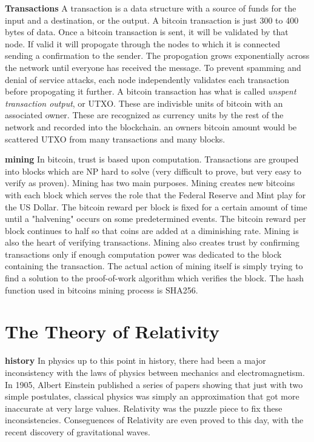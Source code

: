 \documentclass[conference]{IEEEtran}
\begin{document}
\textbf{Transactions} A transaction is a data structure with a source of funds for the input and a destination, or the output. A bitcoin transaction is just 300 to 400 bytes of data. Once a bitcoin transaction is sent, it will be validated by that node. If valid it will propogate through the nodes to which it is connected sending a confirmation to the sender. The propogation grows exponentially across the network until everyone has received the message. To prevent spamming and denial of service attacks, each node independently validates each transaction before propogating it further. A bitcoin transaction has what is called \textit{unspent transaction output}, or UTXO. These are indivisble units of bitcoin with an associated owner. These are recognized as currency units by the rest of the network and recorded into the blockchain. an owners bitcoin amount would be scattered UTXO from many transactions and many blocks. 

\textbf{mining} In bitcoin, trust is based upon computation. Transactions are grouped into blocks which are NP hard to solve (very difficult to prove, but very easy to verify as proven). Mining has two main purposes. Mining creates new bitcoins with each block which serves the role that the Federal Reserve and Mint play for the US Dollar. The bitcoin reward per block is fixed for a certain amount of time until a "halvening" occurs on some predetermined events. The bitcoin reward per block continues to half so that coins are added at a diminishing rate. Mining is also the heart of verifying transactions. Mining also creates trust by confirming transactions only if enough computation power was dedicated to the block containing the transaction. The actual action of mining itself is simply trying to find a solution to the proof-of-work algorithm which verifies the block. The hash function used in bitcoins mining process is SHA256. 

\section{The Theory of Relativity}
\textbf{history} In physics up to this point in history, there had been a major inconsistency with the laws of physics between mechanics and electromagnetism. In 1905, Albert Einstein published a series of papers showing that just with two simple postulates, classical physics was simply an approximation that got more inaccurate at very large values. Relativity was the puzzle piece to fix these inconsistencies. Conseguences of Relativity are even proved to this day, with the recent discovery of gravitational waves. 
\end{document}
